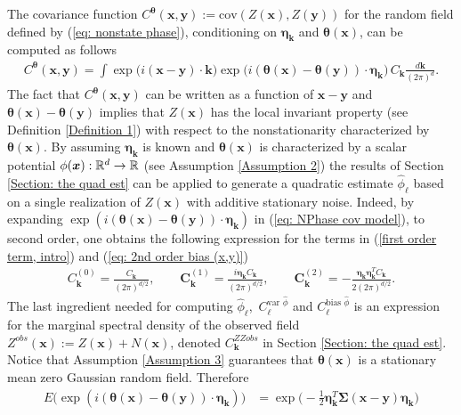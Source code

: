 \documentclass[10pt,noinfoline]{imsart}
\newcommand{\bs}{\boldsymbol}
\begin{document}
  
The covariance function $C^{\bs \theta}(\bs x,\bs y):=\text{cov}(Z(\bs x), Z(\bs y))$ for the random field defined by (\ref{eq: nonstate phase}), conditioning on $\bs \eta_{\bs k}$ and $\bs \theta(\bs x)$, can be computed as follows
\begin{align}
\label{eq: NPhase cov model}
C^{\bs \theta}(\bs x,\bs y)=
\int  \exp\big(i(\bs x-\bs y)\cdot \bs k\big)\exp\big( i(\bs\theta(\bs x)-\bs\theta(\bs y)) \cdot \bs\eta_{\bs k}\big)\,C_{\bs k}\frac{d\bs k}{(2\pi)^d} .
\end{align}
The fact that $C^{\bs \theta}(\bs x,\bs y)$ can be written as a function of $\bs x-\bs y$ and $\bs\theta(\bs x)-\bs\theta(\bs y)$ implies that $Z(\bs x)$ has the local invariant property (see Definition \ref{Definition 1}) with respect to the nonstationarity characterized by $\bs\theta(\bs x)$. By assuming $\bs \eta_{\bs k}$ is known and $\bs \theta(\bs x)$ is characterized by a scalar potential $\phi(\bs x):\Bbb R^d \rightarrow \Bbb R$ (see Assumption \ref{Assumption 2}) the results of Section \ref{Section: the quad est} can be applied to generate a quadratic estimate $\hat\phi_{\bs \ell}$ based on a single realization of $Z(\bs x)$ with additive stationary noise.  Indeed, by expanding $\exp( i(\bs\theta(\bs x)-\bs\theta(\bs y)) \cdot \bs\eta_{\bs k})$ in (\ref{eq: NPhase cov model}), to second order, one obtains the following expression for the terms in (\ref{first order term, intro}) and (\ref{eq: 2nd order bias (x,y)})
\begin{align}
C_{\bs k}^{(0)} =  \frac{C_{\bs k}}{(2\pi)^{d/2}}, \qquad \bs C_{\bs k}^{(1)} = \frac{i  \bs \eta_{\bs k} C_{\bs k}}{(2\pi)^{d/2}},\qquad \bs C_{\bs k}^{(2)} = -\frac{\bs \eta_{\bs k}\bs \eta_{\bs k}^T C_{\bs k}}{2(2\pi)^{d/2}}.\label{eq: C(1), C(2) and C(3) for nonstationary phase}
\end{align}
The last ingredient needed for computing  $\hat\phi_{\bs \ell}$,\, $C_{\bs\ell}^{\text{var }\hat \phi}$ and $C_{\bs \ell}^{\text{bias }\hat \phi}$ is an expression for the marginal spectral density of the observed field $Z^{obs}(\bs x):=Z(\bs x) + N(\bs x)$, denoted $C^{ZZobs}_{\bs k}$ in Section \ref{Section: the quad est}. Notice that  Assumption \ref{Assumption 3} guarantees that $\bs \theta(\bs x)$ is a stationary mean zero Gaussian random field. Therefore
\begin{align*}
E\big(\exp(i (\bs \theta(\bs x) - \bs\theta(\bs y))\cdot \bs \eta_{\bs k})\big)
& = \exp\!\big(\!-\textstyle\frac{1}{2}\bs\eta^T_{\bs k} \bs\Sigma(\bs x-\bs y) \bs \eta_{\bs k}\big)
\end{align*}
\end{document}

